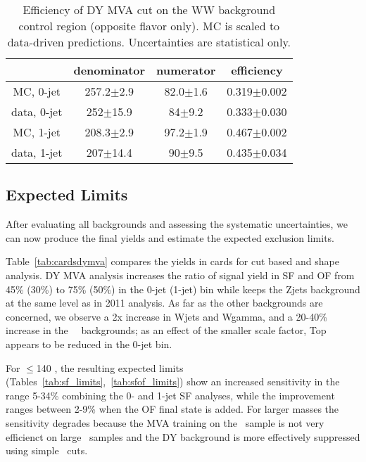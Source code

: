 \begin{table}[!ht]
\begin{center}
\begin{tabular} {|c|cc|c|}
\hline
     & denominator & numerator & efficiency \\
\hline
\hline
MC, 0-jet   & 257.2$\pm$2.9  & 82.0$\pm$1.6 & 0.319$\pm$0.002 \\
data, 0-jet &   252$\pm$15.9 &   84$\pm$9.2 & 0.333$\pm$0.030 \\
\hline
\hline
MC, 1-jet   & 208.3$\pm$2.9  & 97.2$\pm$1.9 & 0.467$\pm$0.002 \\
data, 1-jet &   207$\pm$14.4 &   90$\pm$9.5 & 0.435$\pm$0.034 \\
\hline
\end{tabular}
\caption{Efficiency of DY MVA cut on the WW background control region (opposite flavor only). 
MC is scaled to data-driven predictions. Uncertainties are statistical only.}
\label{tab:dataeff}
\end{center}
\end{table}

\subsection{Expected Limits}

After evaluating all backgrounds and assessing the systematic uncertainties, we can now produce the final yields and estimate the expected exclusion limits.

Table~\ref{tab:cardsdymva} compares the yields in  \GeVcc cards for cut based and shape analysis.
DY MVA analysis increases the ratio of signal yield in SF and OF from 45\% (30\%) to 75\% (50\%) in the 0-jet (1-jet) bin while keeps the Zjets background at the same 
level as in 2011 analysis. As far as the other backgrounds are concerned, we observe a 2x increase in Wjets and Wgamma, and a 20-40\% increase in the \W\W\, \V\V\ backgrounds;
as an effect of the smaller scale factor, Top appears to be reduced in the 0-jet bin.

For \mHi$\leq$140 \GeVcc, the resulting expected limits (Tables~\ref{tab:sf_limits},~\ref{tab:sfof_limits}) show an increased sensitivity in the range 5-34\% combining 
the 0- and 1-jet SF analyses, while the improvement ranges between 2-9\% when the OF final state is added. 
For larger masses the sensitivity degrades because the MVA training on the  \GeVcc\ sample is not very efficienct on large \mHi\ samples and the DY 
background is more effectively suppressed using simple \met\ cuts.

